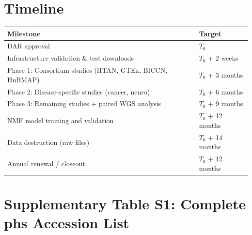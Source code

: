 \documentclass[11pt,letterpaper]{article}
\begin{document}
\section{Timeline}

\begin{tabular}{@{} l l @{}}
\toprule
\textbf{Milestone} & \textbf{Target} \\
\midrule
DAR approval & $T_0$ \\
Infrastructure validation \& test downloads & $T_0$ + 2 weeks \\
Phase 1: Consortium studies (HTAN, GTEx, BICCN, HuBMAP) & $T_0$ + 3 months \\
Phase 2: Disease-specific studies (cancer, neuro) & $T_0$ + 6 months \\
Phase 3: Remaining studies + paired WGS analysis & $T_0$ + 9 months \\
NMF model training and validation & $T_0$ + 12 months \\
Data destruction (raw files) & $T_0$ + 14 months \\
Annual renewal / closeout & $T_0$ + 12 months \\
\bottomrule
\end{tabular}

\section*{Supplementary Table S1: Complete phs Accession List}
\end{document}
